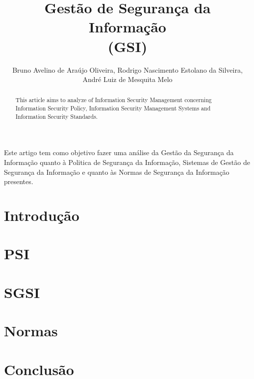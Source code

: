 \documentclass[12pt]{article}
\title{Gestão de Segurança da Informação \\
(GSI)}
\author{Bruno Avelino de Araújo Oliveira, Rodrigo Nascimento Estolano da Silveira, André Luiz de Mesquita Melo }
\begin{document}
 

\maketitle

\begin{abstract}
    This article aims to analyze of Information Security Management concerning Information Security Policy, Information Security Management Systems and Information Security Standards.
\end{abstract}
     
\begin{resumo} 
Este artigo tem como objetivo fazer uma análise da
Gestão da Segurança da Informação quanto à Politica de Segurança da Informação, Sistemas de Gestão de Segurança da Informação e quanto às Normas de Segurança da Informação presentes.


\end{resumo}

\section{Introdução}

\section{PSI}

\section{SGSI}


\section{Normas}

\section{Conclusão}


\newpage



\end{document}
